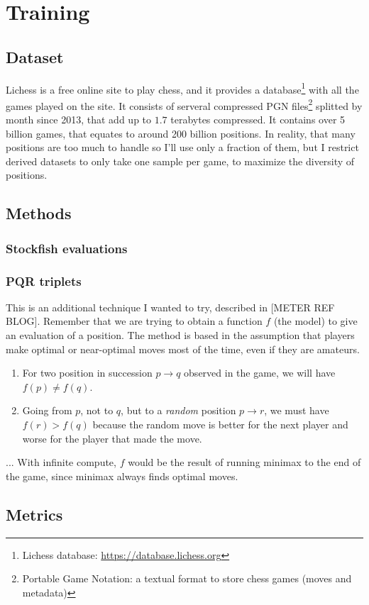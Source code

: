 
\section{Training}

\subsection{Dataset}

Lichess is a free online site to play chess, and it provides a database\footnote[1]{Lichess database: \url{https://database.lichess.org}} with all the games played on the site. It consists of serveral compressed PGN files\footnote[2]{Portable Game Notation: a textual format to store chess games (moves and metadata)} splitted by month since 2013, that add up to $1.7$ terabytes compressed. It contains over 5 billion games, that equates to around 200 billion positions. In reality, that many positions are too much to handle so I'll use only a fraction of them, but I restrict derived datasets to only take one sample per game, to maximize the diversity of positions.


\subsection{Methods}



\subsubsection{Stockfish evaluations}


\subsubsection{PQR triplets}

This is an additional technique I wanted to try, described in [METER REF BLOG]. Remember that we are trying to obtain a function $f$ (the model) to give an evaluation of a position. The method is based in the assumption that players make optimal or near-optimal moves most of the time, even if they are amateurs.

\begin{enumerate}
\item For two position in succession $p \rightarrow q$  observed in the game, we will have $f(p) \neq f(q)$.
\item Going from $p$, not to $q$, but to a \textit{random} position $p \rightarrow r$, we must have $f(r) > f(q)$ because the random move is better for the next player and worse for the player that made the move.
\end{enumerate}


... With infinite compute, $f$ would be the result of running minimax to the end of the game, since minimax always finds optimal moves.

\subsection{Metrics}
